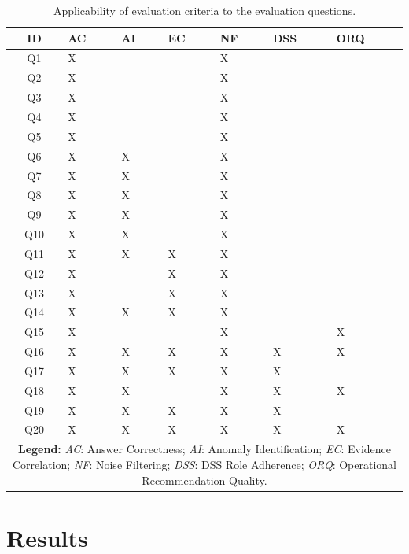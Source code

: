 \begin{table}[htbp]
\centering
\caption{Applicability of evaluation criteria to the evaluation questions.}
\label{tab:criteria_applicability}
\renewcommand{\arraystretch}{1.1}
\begin{tabularx}{\textwidth}{c *{6}{>{\centering\arraybackslash}X}}
\toprule
\textbf{ID} & \textbf{AC} & \textbf{AI} & \textbf{EC} & \textbf{NF} & \textbf{DSS} & \textbf{ORQ} \\
\midrule
Q1  & X &   &   & X &   &   \\
Q2  & X &   &   & X &   &   \\
Q3  & X &   &   & X &   &   \\
Q4  & X &   &   & X &   &   \\
Q5  & X &   &   & X &   &   \\
Q6  & X & X &   & X &   &   \\
Q7  & X & X &   & X &   &   \\
Q8  & X & X &   & X &   &   \\
Q9  & X & X &   & X &   &   \\
Q10 & X & X &   & X &   &   \\
\midrule
Q11 & X & X & X & X &   &   \\
Q12 & X &   & X & X &   &   \\
Q13 & X &   & X & X &   &   \\
Q14 & X & X & X & X &   &   \\
Q15 & X &   &   & X &   & X \\
Q16 & X & X & X & X & X & X \\
\midrule
Q17 & X & X & X & X & X &   \\
Q18 & X & X &   & X & X & X \\
Q19 & X & X & X & X & X &   \\
Q20 & X & X & X & X & X & X \\
\bottomrule
\multicolumn{7}{p{\linewidth}}{%
\vspace{0.1cm}\small
\textbf{Legend:}
\textit{AC}: Answer Correctness;
\textit{AI}: Anomaly Identification;
\textit{EC}: Evidence Correlation;
\textit{NF}: Noise Filtering;
\textit{DSS}: DSS Role Adherence;
\textit{ORQ}: Operational Recommendation Quality.
}
\end{tabularx}
\end{table}



\section{Results}
\label{sec:evaluation results}

